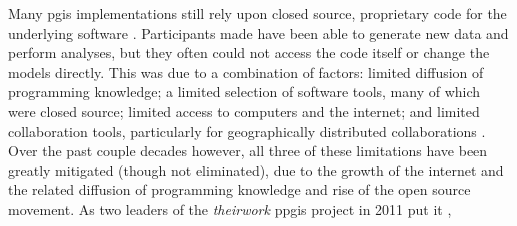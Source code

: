 \documentclass[notitlepage]{article}
\begin{document}
%



Many \ac{pgis} implementations still rely upon closed source, proprietary code for the underlying software \cite{heikkilaGISDeadLong1998}. Participants made have been able to generate new data and perform analyses, but they often could not access the code itself or change the models directly. This was due to a combination of factors: limited diffusion of programming knowledge; a limited selection of software tools, many of which were closed source; limited access to computers and the internet; and limited collaboration tools, particularly for geographically distributed collaborations \cite{cramptonIntroductionCriticalCartography2005}. Over the past couple decades however, all three of these limitations have been greatly mitigated (though not eliminated), due to the growth of the internet and the related diffusion of programming knowledge and rise of the open source movement. As two leaders of the \textit{theirwork} \ac{ppgis} project in 2011 put it \cite{williamsonTheirworkDevelopmentSustainable2011}, 
\end{document}
